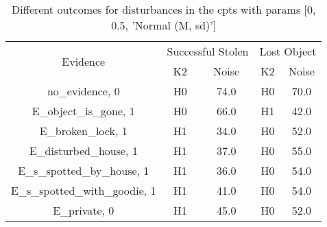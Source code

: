 \begin{table}\begin{tabular}{c|cc|cc}\toprule\multirow{2}{*}{Evidence} & \multicolumn{2}{c}{Successful Stolen} & \multicolumn{2}{c}{Lost Object} \\& {K2} & {Noise} & {K2} & {Noise} \\\midrule
no\_evidence, 0 & \cellcolor{Bittersweet}H0&\cellcolor{Bittersweet}74.0&\cellcolor{Bittersweet}H0&\cellcolor{Bittersweet}70.0\\E\_object\_is\_gone, 1 & \cellcolor{Bittersweet}H0&\cellcolor{Bittersweet}66.0&\cellcolor{Bittersweet}H1&\cellcolor{Bittersweet}42.0\\E\_broken\_lock, 1 & \cellcolor{Bittersweet}H1&\cellcolor{Bittersweet}34.0&\cellcolor{Bittersweet}H0&\cellcolor{Bittersweet}52.0\\E\_disturbed\_house, 1 & \cellcolor{Bittersweet}H1&\cellcolor{Bittersweet}37.0&\cellcolor{Bittersweet}H0&\cellcolor{Bittersweet}55.0\\E\_s\_spotted\_by\_house, 1 & \cellcolor{Bittersweet}H1&\cellcolor{Bittersweet}36.0&\cellcolor{Bittersweet}H0&\cellcolor{Bittersweet}54.0\\E\_s\_spotted\_with\_goodie, 1 & \cellcolor{Bittersweet}H1&\cellcolor{Bittersweet}41.0&\cellcolor{Bittersweet}H0&\cellcolor{Bittersweet}54.0\\E\_private, 0 & \cellcolor{Bittersweet}H1&\cellcolor{Bittersweet}45.0&\cellcolor{Bittersweet}H0&\cellcolor{Bittersweet}52.0\\\bottomrule\end{tabular}\caption{Different outcomes for disturbances in the cpts with params [0, 0.5, 'Normal (M, sd)']}\end{table}